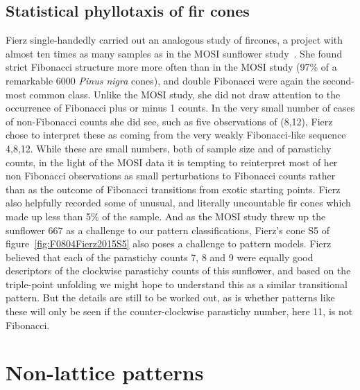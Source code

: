 \subsection{Statistical phyllotaxis of fir cones}

Fierz single-handedly carried out an analogous study of fircones, a  project with almost ten times as many samples as in the MOSI sunflower study~\autocite{fierzAberrantPhyllotacticPatterns2015}. She found strict Fibonacci structure more more often than in the MOSI study (97\% of a remarkable 6000 \textit{Pinus nigra} cones), and double Fibonacci were again the second-most common class. Unlike the MOSI study, she did not draw attention to the occurrence of Fibonacci plus or minus 1 counts. In the very small number of cases of non-Fibonacci counts she did see, such as five  observations of (8,12),  Fierz chose to interpret these as coming from the very weakly Fibonacci-like sequence 4,8,12. While these are small numbers, both of sample size and of parastichy counts, in the light of the MOSI data  it is tempting to reinterpret most of her non Fibonacci observations as small perturbations to Fibonacci counts rather than as the outcome of Fibonacci transitions from exotic starting points. Fierz also helpfully recorded some of unusual, and literally uncountable fir cones which made up less than 5\% of the sample.  And as the MOSI study threw up the sunflower 667 as a challenge to our pattern classifications, 
Fierz's cone S5 of figure~\ref{fig:F0804Fierz2015S5} also poses a challenge to pattern models. Fierz believed that each of the parastichy counts 7, 8 and 9 were equally good descriptors of the clockwise parastichy counts of this sunflower, and based on the triple-point unfolding we might hope to understand this as a similar transitional pattern. But the details are still to be worked out, as is whether patterns like these will only be seen if the counter-clockwise parastichy number, here 11, is not Fibonacci.


\section{Non-lattice patterns}
